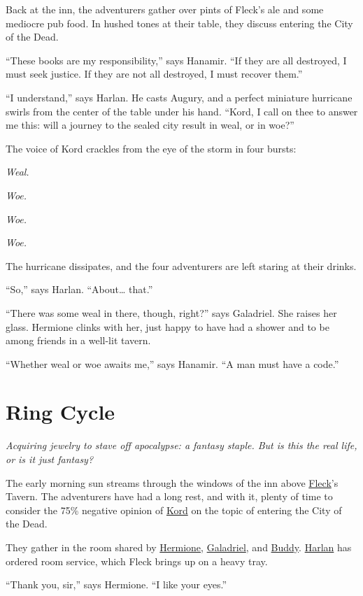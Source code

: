 \documentclass[smalldemyvopaper,11pt,twoside,onecolumn,openright,extrafontsizes]{memoir}
\newcommand{\chapdesc}[1]{
    \begin{flushright}
    \emph{{#1}}
    \end{flushright}
    \vspace{26pt}
}
\begin{document}
Back at the inn, the adventurers gather over pints of Fleck's ale and
some mediocre pub food. In hushed tones at their table, they discuss
entering the City of the Dead.

``These books are my responsibility,'' says Hanamir. ``If they are all
destroyed, I must seek justice. If they are not all destroyed, I must
recover them.''

``I understand,'' says Harlan. He casts Augury, and a perfect miniature
hurricane swirls from the center of the table under his hand. ``Kord, I
call on thee to answer me this: will a journey to the sealed city result
in weal, or in woe?''

The voice of Kord crackles from the eye of the storm in four bursts:

\emph{Weal.}

\emph{Woe.}

\emph{Woe.}

\emph{Woe.}

The hurricane dissipates, and the four adventurers are left staring at
their drinks.

``So,'' says Harlan. ``About\ldots{} that.''

``There was some weal in there, though, right?'' says Galadriel. She
raises her glass. Hermione clinks with her, just happy to have had a
shower and to be among friends in a well-lit tavern.

``Whether weal or woe awaits me,'' says Hanamir. ``A man must have a
code.''


\chapter{Ring Cycle}
\chapdesc{Acquiring jewelry to stave off apocalypse: a fantasy staple. But is this the real life, or is it just fantasy?}

The early morning sun streams through the windows of the inn above
\href{/characters/fleck/}{Fleck}'s Tavern. The adventurers have had a
long rest, and with it, plenty of time to consider the 75\% negative
opinion of \href{/characters/kord/}{Kord} on the topic of entering the
City of the Dead.

They gather in the room shared by
\href{/characters/hermione/}{Hermione},
\href{/characters/galadriel/}{Galadriel}, and
\href{/characters/buddy/}{Buddy}. \href{/characters/harlan/}{Harlan} has
ordered room service, which Fleck brings up on a heavy tray.

``Thank you, sir,'' says Hermione. ``I like your eyes.''
\end{document}
